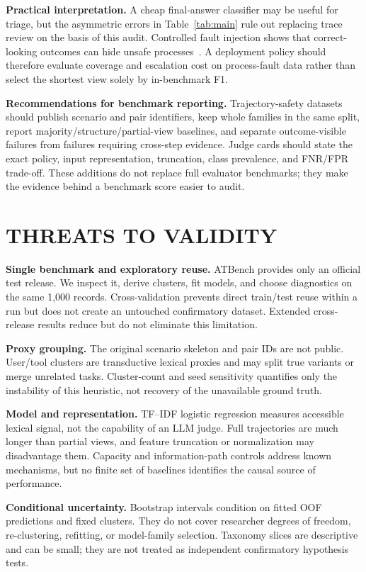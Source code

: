 \documentclass[10pt,twocolumn,twoside]{article}
\begin{document}
\textbf{Practical interpretation.}
A cheap final-answer classifier may be useful for triage, but the asymmetric errors
in Table~\ref{tab:main} rule out replacing trace review on the basis of this audit.
Controlled fault injection shows that correct-looking outcomes can hide unsafe
processes~\cite{trajectoryjudge}. A deployment policy should therefore evaluate
coverage and escalation cost on process-fault data rather than select the shortest
view solely by in-benchmark F1.

\textbf{Recommendations for benchmark reporting.}
Trajectory-safety datasets should publish scenario and pair identifiers, keep whole
families in the same split, report majority/structure/partial-view baselines, and
separate outcome-visible failures from failures requiring cross-step evidence.
Judge cards should state the exact policy, input representation, truncation, class
prevalence, and FNR/FPR trade-off. These additions do not replace full evaluator
benchmarks; they make the evidence behind a benchmark score easier to audit.

\section{THREATS TO VALIDITY}

\textbf{Single benchmark and exploratory reuse.}
ATBench provides only an official test release. We inspect it, derive clusters, fit
models, and choose diagnostics on the same 1,000 records. Cross-validation prevents
direct train/test reuse within a run but does not create an untouched confirmatory
dataset. Extended cross-release results reduce but do not eliminate this limitation.

\textbf{Proxy grouping.}
The original scenario skeleton and pair IDs are not public. User/tool clusters are
transductive lexical proxies and may split true variants or merge unrelated tasks.
Cluster-count and seed sensitivity quantifies only the instability of this heuristic,
not recovery of the unavailable ground truth.

\textbf{Model and representation.}
TF--IDF logistic regression measures accessible lexical signal, not the capability
of an LLM judge. Full trajectories are much longer than partial views, and feature
truncation or normalization may disadvantage them. Capacity and information-path
controls address known mechanisms, but no finite set of baselines identifies the
causal source of performance.

\textbf{Conditional uncertainty.}
Bootstrap intervals condition on fitted OOF predictions and fixed clusters. They do
not cover researcher degrees of freedom, re-clustering, refitting, or model-family
selection. Taxonomy slices are descriptive and can be small; they are not treated as
independent confirmatory hypothesis tests.
\end{document}
